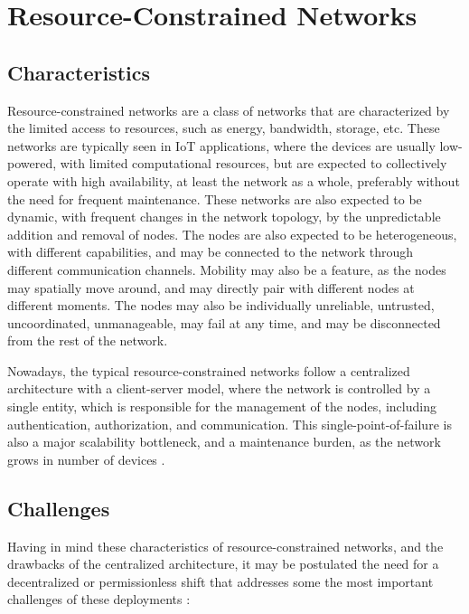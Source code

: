 \documentclass[journal]{IEEEtran}
\begin{document}
\section{Resource-Constrained Networks}

\subsection{Characteristics}

Resource-constrained networks are a class of networks that are characterized by the
limited access to resources, such as energy, bandwidth, storage, etc.
These networks are typically seen in IoT applications, where the devices are
usually low-powered, with limited computational resources, but are expected to 
collectively operate with high availability, at least the network as a whole, 
preferably without the need for frequent maintenance.
These networks are also expected to be dynamic, with frequent changes in the network
topology, by the unpredictable addition and removal of nodes. 
The nodes are also expected to be heterogeneous, with different capabilities, and may be
connected to the network through different communication channels. 
Mobility may also be a feature, as the nodes may spatially move around, 
and may directly pair with different nodes at different moments.
The nodes may also be individually unreliable, untrusted, uncoordinated, unmanageable, may fail at any time, 
and may be disconnected from the rest of the network.

Nowadays, the typical resource-constrained networks follow a centralized architecture
with a client-server model, where the network is controlled by a single entity,
which is responsible for the management of the nodes, including authentication,
authorization, and communication. This single-point-of-failure is also a major
scalability bottleneck, and a maintenance burden, as the network grows in number of devices \cite{SALIMITARI2020100212}.

\subsection{Challenges}

Having in mind these characteristics of resource-constrained networks,
and the drawbacks of the centralized architecture, it may be postulated the 
need for a decentralized or permissionless shift that addresses some the most important challenges
of these deployments \cite{SALIMITARI2020100212}:
\end{document}
